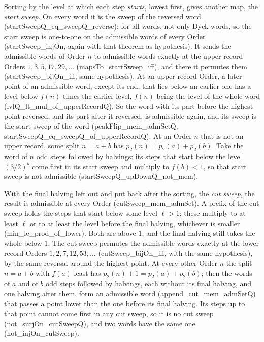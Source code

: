 \documentclass[10pt,a4paper,titlepage]{article}
\makeatletter
\newcommand{\termhere}[1]{\leavevmode
  \Hy@raisedlink{\hyper@anchorstart{term:#1}\hyper@anchorend}}
\newcommand{\keyterm}[2]{\hyperlink{box:#1}{\emph{#2}}}
\newcommand{\lean}[1]{\textsf{#1}}
\makeatother
\begin{document}
\termhere{startsweep}Sorting by the level at which each step \emph{starts}, lowest first, gives another
map, the \keyterm{startsweep}{start sweep}. On every word it is the sweep of the reversed word
(\lean{startSweepQ\_eq\_sweepQ\_reverse}); for all words, not only Dyck words,
so the start sweep is one-to-one on the admissible words of every Order
(\lean{startSweep\_injOn}, again with that theorem as hypothesis). It sends the admissible
words of Order $n$ to admissible words exactly at the upper record Orders $1, 3, 5, 17, 29, \dots$
(\lean{mapsTo\_startSweep\_iff}), and there it permutes them (\lean{startSweep\_bijOn\_iff}, same hypothesis).
At an upper record Order, a later point of an admissible word, except its end, that lies
below an earlier one has a level below $f(n)$ times the earlier level, $f(n)$ being the
level of the whole word (\lean{lvlQ\_lt\_mul\_of\_upperRecordQ}). So the word with its part
before the highest point reversed, and its part after it reversed, is admissible again, and
its sweep is the start sweep of the word (\lean{peakFlip\_mem\_admSetQ},
\lean{startSweepQ\_eq\_sweepQ\_of\_upperRecordQ}). At an Order $n$ that is not an upper
record, some split $n = a + b$ has $p_2(n) = p_2(a) + p_2(b)$. Take the word of $n$ odd
steps followed by halvings: its steps that start below the level $(3/2)^b$ come first in
its start sweep and multiply to $f(b) < 1$, so that start sweep is not admissible
(\lean{startSweepQ\_upDownQ\_not\_mem}).

\termhere{cutsweep}With the final halving left out and put back after the sorting, the \keyterm{cutsweep}{cut
sweep}, the result is admissible at every Order (\lean{cutSweep\_mem\_admSet}). A prefix of
the cut sweep holds the steps that start below some level $\ell > 1$; these multiply to at
least $\ell$ or to at least the level before the final halving, whichever is smaller
(\lean{min\_le\_prod\_of\_lower}). Both are above $1$, and the final halving still takes
the whole below $1$. The cut sweep permutes the admissible words exactly at the lower
record Orders $1, 2, 7, 12, 53, \dots$ (\lean{cutSweep\_bijOn\_iff}, with the same
hypothesis), by the same reversal around the highest point. At every other Order $n$ the
split $n = a + b$ with $f(a)$ least has $p_2(n) + 1 = p_2(a) + p_2(b)$; then the words of $a$ and of $b$ odd
steps followed by halvings, each without its final halving, and one halving after them,
form an admissible word (\lean{append\_cut\_mem\_admSetQ}) that passes a point lower than
the one before its final halving. Its steps up to that point cannot come first in any cut
sweep, so it is no cut sweep (\lean{not\_surjOn\_cutSweepQ}), and two words have the same
one (\lean{not\_injOn\_cutSweep}).
\end{document}
